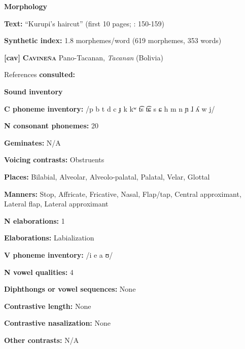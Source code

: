 \textbf{Morphology}



\textbf{Text:} “Kurupi’s haircut” (first 10 pages; \citealt{Courtz2008}: 150-159)



\textbf{Synthetic index:} 1.8 morphemes/word (619 morphemes, 353 words)



\textbf{[cav]}   \textbf{\textsc{Cavineña}  }  Pano-Tacanan, \textit{Tacanan} (Bolivia)



References \textbf{consulted:} \citet{Guillaume2008}



\textbf{Sound inventory}



\textbf{C phoneme inventory:} /p b t d c ɟ k kʷ t͡s t͡ɕ s ɕ h m n ɲ ɺ ʎ w j/



\textbf{N consonant phonemes:} 20



\textbf{Geminates:} N/A



\textbf{Voicing contrasts:} Obstruents



\textbf{Places:} Bilabial, Alveolar, Alveolo-palatal, Palatal, Velar, Glottal



\textbf{Manners:} Stop, Affricate, Fricative, Nasal, Flap/tap, Central approximant, Lateral flap, Lateral approximant



\textbf{N elaborations:} 1



\textbf{Elaborations:} Labialization



\textbf{V phoneme inventory:} /i e a ʊ/



\textbf{N vowel qualities:} 4



\textbf{Diphthongs or vowel sequences:} None



\textbf{Contrastive length:} None



\textbf{Contrastive nasalization:} None



\textbf{Other contrasts:} N/A



